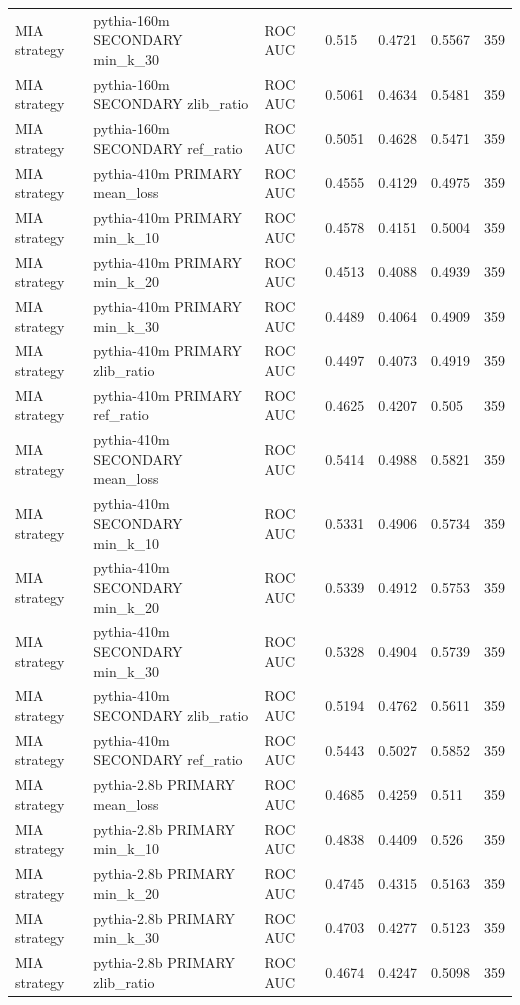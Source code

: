 \begin{tabular}{lllllll}
MIA strategy & pythia-160m SECONDARY min\_k\_30 & ROC AUC & 0.515 & 0.4721 & 0.5567 & 359 \\
MIA strategy & pythia-160m SECONDARY zlib\_ratio & ROC AUC & 0.5061 & 0.4634 & 0.5481 & 359 \\
MIA strategy & pythia-160m SECONDARY ref\_ratio & ROC AUC & 0.5051 & 0.4628 & 0.5471 & 359 \\
MIA strategy & pythia-410m PRIMARY mean\_loss & ROC AUC & 0.4555 & 0.4129 & 0.4975 & 359 \\
MIA strategy & pythia-410m PRIMARY min\_k\_10 & ROC AUC & 0.4578 & 0.4151 & 0.5004 & 359 \\
MIA strategy & pythia-410m PRIMARY min\_k\_20 & ROC AUC & 0.4513 & 0.4088 & 0.4939 & 359 \\
MIA strategy & pythia-410m PRIMARY min\_k\_30 & ROC AUC & 0.4489 & 0.4064 & 0.4909 & 359 \\
MIA strategy & pythia-410m PRIMARY zlib\_ratio & ROC AUC & 0.4497 & 0.4073 & 0.4919 & 359 \\
MIA strategy & pythia-410m PRIMARY ref\_ratio & ROC AUC & 0.4625 & 0.4207 & 0.505 & 359 \\
MIA strategy & pythia-410m SECONDARY mean\_loss & ROC AUC & 0.5414 & 0.4988 & 0.5821 & 359 \\
MIA strategy & pythia-410m SECONDARY min\_k\_10 & ROC AUC & 0.5331 & 0.4906 & 0.5734 & 359 \\
MIA strategy & pythia-410m SECONDARY min\_k\_20 & ROC AUC & 0.5339 & 0.4912 & 0.5753 & 359 \\
MIA strategy & pythia-410m SECONDARY min\_k\_30 & ROC AUC & 0.5328 & 0.4904 & 0.5739 & 359 \\
MIA strategy & pythia-410m SECONDARY zlib\_ratio & ROC AUC & 0.5194 & 0.4762 & 0.5611 & 359 \\
MIA strategy & pythia-410m SECONDARY ref\_ratio & ROC AUC & 0.5443 & 0.5027 & 0.5852 & 359 \\
MIA strategy & pythia-2.8b PRIMARY mean\_loss & ROC AUC & 0.4685 & 0.4259 & 0.511 & 359 \\
MIA strategy & pythia-2.8b PRIMARY min\_k\_10 & ROC AUC & 0.4838 & 0.4409 & 0.526 & 359 \\
MIA strategy & pythia-2.8b PRIMARY min\_k\_20 & ROC AUC & 0.4745 & 0.4315 & 0.5163 & 359 \\
MIA strategy & pythia-2.8b PRIMARY min\_k\_30 & ROC AUC & 0.4703 & 0.4277 & 0.5123 & 359 \\
MIA strategy & pythia-2.8b PRIMARY zlib\_ratio & ROC AUC & 0.4674 & 0.4247 & 0.5098 & 359 \\

\end{tabular}
